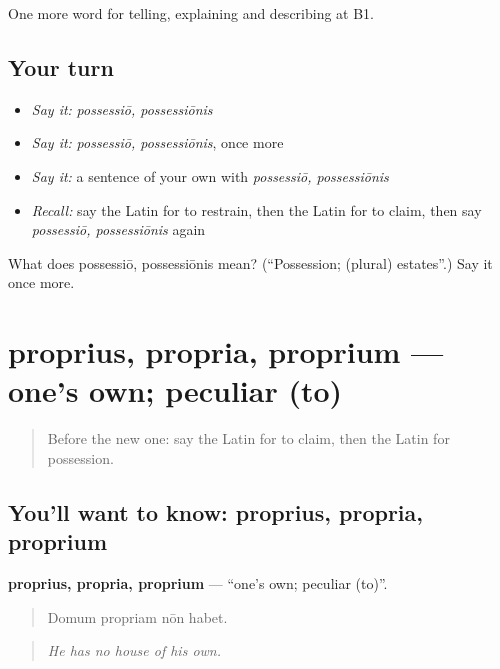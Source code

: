 \begin{grammarlens}[title={What you've built}]
One more word for telling, explaining and describing at B1.
\end{grammarlens}

\subsection*{Your turn}
\begin{itemize}
\raggedright
  \item \emph{Say it:} \emph{possessiō, possessiōnis}
  \item \emph{Say it:} \emph{possessiō, possessiōnis}, once more
  \item \emph{Say it:} a sentence of your own with \emph{possessiō, possessiōnis}
  \item \emph{Recall:} say the Latin for to restrain, then the Latin for to claim, then say \emph{possessiō, possessiōnis} again
\end{itemize}

\begin{tcolorbox}[breakable,colback=teal!4,colframe=teal!35!black,title={Before you move on}]
What does possessiō, possessiōnis mean? (\textquotedblleft{}Possession; (plural) estates\textquotedblright{}.) Say it once more.
\end{tcolorbox}
\section[proprius, propria, proprium]{proprius, propria, proprium — one's own; peculiar (to)}

\label{lesson:LA-C417-proprius}



\begin{quote}
Before the new one: say the Latin for to claim, then the Latin for possession.
\end{quote}

\subsection*{You'll want to know: proprius, propria, proprium}
\textbf{proprius, propria, proprium} — \textquotedblleft{}one's own; peculiar (to)\textquotedblright{}.

\begin{quote}
Domum propriam nōn habet.
\end{quote}

\begin{quote}
\emph{He has no house of his own.}
\end{quote}


